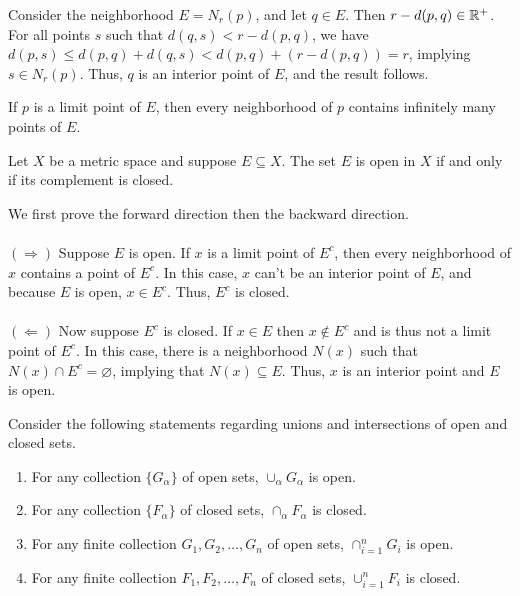 \documentclass{mathnotes}
\begin{document}
\begin{pf}
  Consider the neighborhood $E=N_r(p)$, and let $q\in E$. Then
  $r-d(p,q)\in\mathbb{R}^+$. For all points $s$ such that $d(q,s)<r-d(p,q)$, we have
  $d(p,s)\le d(p,q)+d(q,s)<d(p,q)+(r-d(p,q))=r$, implying $s\in N_r(p)$. Thus,
  $q$ is an interior point of $E$, and the result follows.
\end{pf}

\begin{prop}
  If $p$ is a limit point of $E$, then every neighborhood of $p$ contains
  infinitely many points of $E$.
\end{prop}

\begin{prop}
  Let $X$ be a metric space and suppose $E\subseteq X$. The set $E$ is open in
  $X$ if and only if its complement is closed.
\end{prop}

\begin{pf}
  We first prove the forward direction then the backward direction.\\\\
  $(\Rightarrow)$ Suppose $E$ is open. If $x$ is a limit point of $E^c$, then
  every neighborhood of $x$ contains a point of $E^c$. In this case, $x$ can't
  be an interior point of $E$, and because $E$ is open, $x\in E^c$. Thus, $E^c$
  is closed.\\\\
  $(\Leftarrow)$ Now suppose $E^c$ is closed. If $x\in E$ then $x\notin E^c$
  and is thus not a limit point of $E^c$. In this case, there is a neighborhood
  $N(x)$ such that $N(x)\cap E^c=\varnothing$, implying that $N(x)\subseteq E$.
  Thus, $x$ is an interior point and $E$ is open.
\end{pf}

\begin{thm}
  Consider the following statements regarding unions and intersections of open
  and closed sets.
  \begin{enumerate}
    \item For any collection $\{G_\alpha\}$ of open sets, $\cup_\alpha
      G_\alpha$ is open.
    \item For any collection $\{F_\alpha\}$ of closed sets, $\cap_\alpha
      F_\alpha$ is closed.
    \item For any finite collection $G_1,G_2,\ldots,G_n$ of open sets,
      $\cap_{i=1}^nG_i$ is open.
    \item For any finite collection $F_1,F_2,\ldots,F_n$ of closed sets,
      $\cup_{i=1}^nF_i$ is closed.
  \end{enumerate}
\end{thm}
\end{document}
